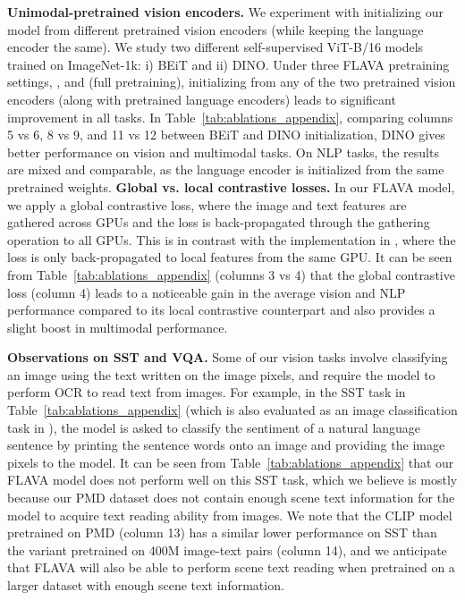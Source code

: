 \documentclass[10pt,twocolumn,letterpaper]{article}
\newcommand{\myparagraph}[1]{\vspace{0.25em}\noindent\textbf{#1}}
\begin{document}
\myparagraph{Unimodal-pretrained vision encoders.} We experiment with initializing our model from different pretrained vision encoders (while keeping the language encoder the same). We study two different self-supervised ViT-B/16 models trained on ImageNet-1k: i) BEiT and ii) DINO. Under three FLAVA pretraining settings, ,  and  (full pretraining), initializing from any of the two pretrained vision encoders (along with pretrained language encoders) leads to significant improvement in all tasks. In Table~\ref{tab:ablations_appendix}, comparing columns 5 vs 6, 8 vs 9, and 11 vs 12 between BEiT and DINO initialization, DINO gives better performance on vision and multimodal tasks. On NLP tasks, the results are mixed and comparable, as the language encoder is initialized from the same pretrained weights. 
\myparagraph{Global vs. local contrastive losses.} In our FLAVA model, we apply a global contrastive loss, where the image and text features are gathered across GPUs and the loss is back-propagated through the gathering operation to all GPUs. This is in contrast with the implementation in \cite{ilharco_gabriel_2021_5143773}, where the loss is only back-propagated to local features from the same GPU. It can be seen from Table~\ref{tab:ablations_appendix} (columns 3 vs 4) that the global contrastive loss (column 4) leads to a noticeable gain in the average vision and NLP performance compared to its local contrastive counterpart and also provides a slight boost in multimodal performance. 

\myparagraph{Observations on SST and VQA.} Some of our vision tasks involve classifying an image using the text written on the image pixels, and require the model to perform OCR to read text from images. For example, in the SST task in Table~\ref{tab:ablations_appendix} (which is also evaluated as an image classification task in \cite{radford2021learning}), the model is asked to classify the sentiment of a natural language sentence by printing the sentence words onto an image and providing the image pixels to the model. It can be seen from Table~\ref{tab:ablations_appendix} that our FLAVA model does not perform well on this SST task, which we believe is mostly because our PMD dataset does not contain enough scene text information for the model to acquire text reading ability from images. We note that the CLIP model pretrained on PMD (column 13) has a similar lower performance on SST than the variant pretrained on 400M image-text pairs (column 14), and we anticipate that FLAVA will also be able to perform scene text reading when pretrained on a larger dataset with enough scene text information.
\end{document}
